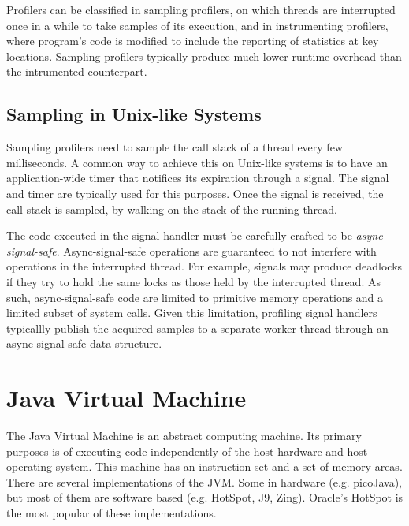 Profilers can be classified in sampling profilers, on which threads are interrupted once in a while to take samples of its execution, and in instrumenting profilers, where program's code is modified to include the reporting of statistics at key locations. Sampling profilers typically produce much lower runtime overhead than the intrumented counterpart.

\subsection{Sampling in Unix-like Systems}

Sampling profilers need to sample the call stack of a thread every few milliseconds. A common way to achieve this on Unix-like systems is to have an application-wide timer that notifices its expiration through a signal. The  signal and  timer are typically used for this purposes. Once the signal is received, the call stack is sampled, by walking on the stack of the running thread.


The code executed in the signal handler must be carefully crafted to be \emph{async-signal-safe}. Async-signal-safe operations are guaranteed to not interfere with operations in the interrupted thread. For example, signals may produce deadlocks if they try to hold the same locks as those held by the interrupted thread. As such, async-signal-safe code are limited to primitive memory operations and a limited subset of system calls. Given this limitation, profiling signal handlers typicallly publish the acquired samples to a separate worker thread through an async-signal-safe data structure.


\section{Java Virtual Machine}

The Java Virtual Machine is an abstract computing machine. Its primary purposes is of executing code independently of the host hardware and host operating system. This machine has an instruction set and a set of memory areas. There are several implementations of the JVM. Some in hardware (e.g. picoJava), but most of them are software based (e.g. HotSpot, J9, Zing). Oracle's HotSpot is the most popular of these implementations.


